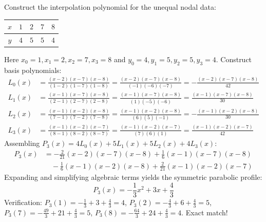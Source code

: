 \begin{examplebox}
Construct the interpolation polynomial for the unequal nodal data:
\begin{center}
\begin{tabular}{c|cccc}
$x$ & $1$ & $2$ & $7$ & $8$ \\
\hline
$y$ & $4$ & $5$ & $5$ & $4$
\end{tabular}
\end{center}
Here $x_0 = 1, x_1 = 2, x_2 = 7, x_3 = 8$ and $y_0 = 4, y_1 = 5, y_2 = 5, y_3 = 4$.
Construct basis polynomials:
\begin{align}
    L_0(x) &= \frac{(x-2)(x-7)(x-8)}{(1-2)(1-7)(1-8)} = \frac{(x-2)(x-7)(x-8)}{(-1)(-6)(-7)} = -\frac{(x-2)(x-7)(x-8)}{42} \\
    L_1(x) &= \frac{(x-1)(x-7)(x-8)}{(2-1)(2-7)(2-8)} = \frac{(x-1)(x-7)(x-8)}{(1)(-5)(-6)} = \frac{(x-1)(x-7)(x-8)}{30} \\
    L_2(x) &= \frac{(x-1)(x-2)(x-8)}{(7-1)(7-2)(7-8)} = \frac{(x-1)(x-2)(x-8)}{(6)(5)(-1)} = -\frac{(x-1)(x-2)(x-8)}{30} \\
    L_3(x) &= \frac{(x-1)(x-2)(x-7)}{(8-1)(8-2)(8-7)} = \frac{(x-1)(x-2)(x-7)}{(7)(6)(1)} = \frac{(x-1)(x-2)(x-7)}{42}
\end{align}
Assembling $P_3(x) = 4 L_0(x) + 5 L_1(x) + 5 L_2(x) + 4 L_3(x)$:
\begin{equation}
\begin{aligned}
    P_3(x) &= -\frac{2}{21}(x-2)(x-7)(x-8) + \frac{1}{6}(x-1)(x-7)(x-8) \\
    &\quad - \frac{1}{6}(x-1)(x-2)(x-8) + \frac{2}{21}(x-1)(x-2)(x-7)
\end{aligned}
\end{equation}
Expanding and simplifying algebraic terms yields the symmetric parabolic profile:
\begin{equation}
    \boxed{P_3(x) = -\frac{1}{3}x^2 + 3x + \frac{4}{3}}
\end{equation}
Verification:
$P_3(1) = -\frac{1}{3} + 3 + \frac{4}{3} = 4$, $P_3(2) = -\frac{4}{3} + 6 + \frac{4}{3} = 5$, $P_3(7) = -\frac{49}{3} + 21 + \frac{4}{3} = 5$, $P_3(8) = -\frac{64}{3} + 24 + \frac{4}{3} = 4$. Exact match!
\end{examplebox}


